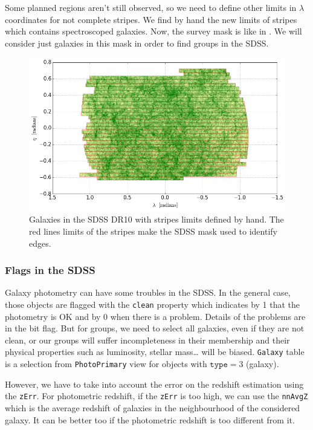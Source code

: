 Some planned regions aren't still observed, so we need to define other limits
in $\lambda$ coordinates for not complete stripes. We find by hand the new
limits of stripes which contains spectroscoped galaxies. Now, the survey mask
is like in . We will consider just galaxies in this mask in
order to find groups in the SDSS\@.
%
\begin{figure}[ht] \centering
    \includegraphics[width=\linewidth]{figures/sdss/sdss.png} \caption{Galaxies
    in the SDSS DR10 with stripes limits defined by hand. The red lines limits
of the stripes make the SDSS mask used to identify edges.\label{fig:sdss}}
\end{figure}

\subsubsection{Flags in the SDSS}

Galaxy photometry can have some troubles in the SDSS\@. In the general case,
those objects are flagged with the \texttt{clean} property which indicates by 1
that the photometry is OK and by 0 when there is a problem. Details of the
problems are in the bit flag. But for groups, we need to select all galaxies,
even if they are not clean, or our groups will suffer incompleteness in their
membership and their physical properties such as luminosity, stellar mass\ldots
will be biased. \texttt{Galaxy} table is a selection from \texttt{PhotoPrimary}
view for objects with $\mathrm{\texttt{type}}=3$ (galaxy).

However, we have to take into account the error on the redshift estimation
using the \texttt{zErr}. For photometric redshift, if the \texttt{zErr} is too
high, we can use the \texttt{nnAvgZ} which is the average redshift of galaxies
in the neighbourhood of the considered galaxy. It can be better too if the
photometric redshift is too different from it.

